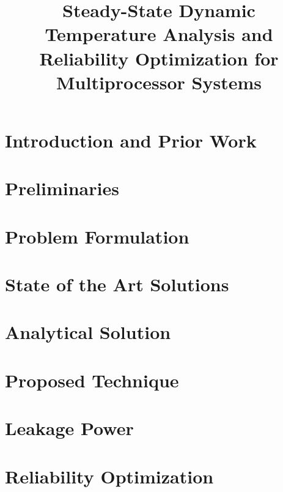 \documentclass[conference]{IEEEtran}
\title{Steady-State Dynamic Temperature Analysis and Reliability Optimization for Multiprocessor Systems}
\author{}
\begin{document}
  \maketitle

  \begin{abstract}
    
  \end{abstract}

  \section{Introduction and Prior Work}
  

  \section{Preliminaries} \label{sec:preliminaries}
  

  \section{Problem Formulation} \label{sec:problem}
  

  \section{State of the Art Solutions} \label{sec:hotspot-solution}
  

  \section{Analytical Solution} \label{sec:analytical-solution}
  

  \section{Proposed Technique} \label{sec:condensed-equation}
  

  \section{Leakage Power} \label{sec:leakage}
  

  \section{Reliability Optimization} \label{sec:reliability}
  
\end{document}
